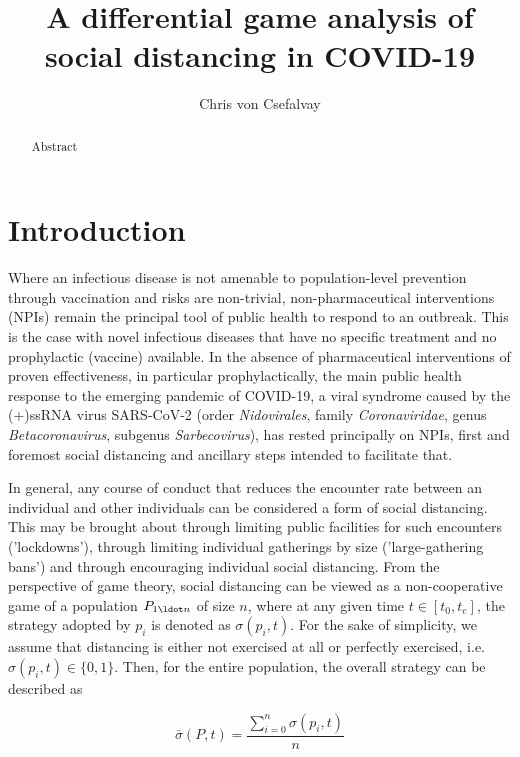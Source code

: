 \documentclass{article}
\title{A differential game analysis of social distancing in COVID-19}
\author{Chris von Csefalvay}
\begin{document}
\maketitle

\begin{abstract}
    Abstract
\end{abstract}

\section{Introduction} %
\label{sec:introduction}
Where an infectious disease is not amenable to population-level prevention through vaccination and risks are non-trivial, non-pharmaceutical interventions (NPIs) remain the principal tool of public health to respond to an outbreak. This is the case with novel infectious diseases that have no specific treatment and no prophylactic (vaccine) available. In the absence of pharmaceutical interventions of proven effectiveness, in particular prophylactically, the main public health response to the emerging pandemic of COVID-19, a viral syndrome caused by the (+)ssRNA virus SARS-CoV-2 (order \emph{Nidovirales}, family \emph{Coronaviridae}, genus \emph{Betacoronavirus}, subgenus \emph{Sarbecovirus}), has rested principally on NPIs, first and foremost social distancing and ancillary steps intended to facilitate that.

In general, any course of conduct that reduces the encounter rate between an individual and other individuals can be considered a form of social distancing. This may be brought about through limiting public facilities for such encounters ('lockdowns'), through limiting individual gatherings by size ('large-gathering bans') and through encouraging individual social distancing. From the perspective of game theory, social distancing can be viewed as a non-cooperative game of a population $P_{1 \ldot n}$ of size $n$, where at any given time $t \in [t_0, t_{e}]$, the strategy adopted by $p_i$ is denoted as $\sigma (p_i, t)$. For the sake of simplicity, we assume that distancing is either not exercised at all or perfectly exercised, i.e. $\sigma (p_i, t) \in \{ 0, 1 \}$. Then, for the entire population, the overall strategy can be described as 

\begin{equation}
	\bar{\sigma}(P, t) = \frac{\displaystyle \sum_{i = 0}^n \sigma(p_i, t)}{n}
	\label{eq:overall_strategy}
\end{equation}
\end{document}
